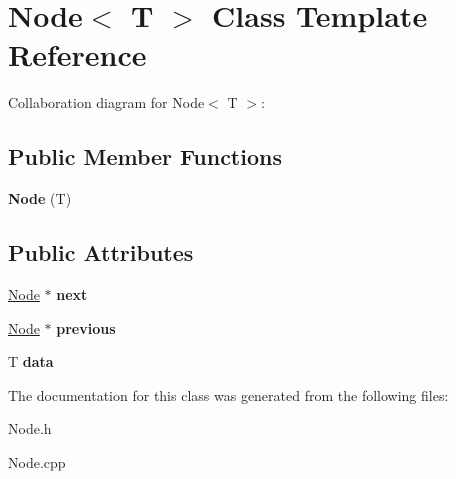 \hypertarget{classNode}{}\section{Node$<$ T $>$ Class Template Reference}
\label{classNode}


Collaboration diagram for Node$<$ T $>$\+:
\subsection*{Public Member Functions}
\begin{DoxyCompactItemize}
\item 
\mbox{\label{classNode_ab2f2bd0551fbce8ee80741462c9c86ef}} 
{\bfseries Node} (T)
\end{DoxyCompactItemize}
\subsection*{Public Attributes}
\begin{DoxyCompactItemize}
\item 
\mbox{\label{classNode_ac1c0563946c59c36bddde431b4adb00b}} 
\hyperlink{classNode}{Node} $\ast$ {\bfseries next}
\item 
\mbox{\label{classNode_a36adf1fae9a4a993a348a26c2ba7ad8b}} 
\hyperlink{classNode}{Node} $\ast$ {\bfseries previous}
\item 
\mbox{\label{classNode_ac450c71a8677a38d306361f9ced518d3}} 
T {\bfseries data}
\end{DoxyCompactItemize}


The documentation for this class was generated from the following files\+:\begin{DoxyCompactItemize}
\item 
Node.\+h\item 
Node.\+cpp\end{DoxyCompactItemize}
